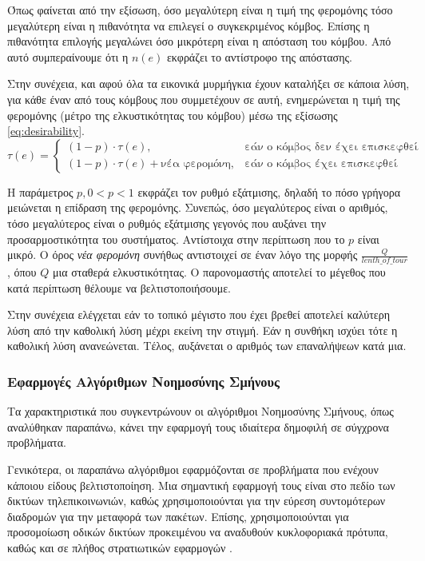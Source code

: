 \documentclass{assignment}
\begin{document}
Όπως φαίνεται από την εξίσωση, όσο μεγαλύτερη είναι η τιμή της φερομόνης τόσο
μεγαλύτερη είναι η πιθανότητα να επιλεγεί ο συγκεκριμένος κόμβος. Επίσης η
πιθανότητα επιλογής μεγαλώνει όσο μικρότερη είναι η απόσταση του κόμβου. Από
αυτό συμπεραίνουμε ότι η $n(e)$ εκφράζει το αντίστροφο της απόστασης.

Στην συνέχεια, και αφού όλα τα εικονικά μυρμήγκια έχουν καταλήξει σε κάποια
λύση, για κάθε έναν από τους κόμβους που συμμετέχουν σε αυτή, ενημερώνεται η
τιμή της φερομόνης (μέτρο της ελκυστικότητας του κόμβου) μέσω της εξίσωσης
\ref{eq:desirability}.
\begin{equation}
    \label{eq:desirability}
\tau(e) = \begin{cases} (1 - p) \cdot \tau(e),& \mbox{εάν ο κόμβος δεν έχει επισκεφθεί}  \\ (1 - p) \cdot \tau(e) + \mbox{νέα φερομόνη},& \mbox{εάν ο κόμβος έχει επισκεφθεί} \end{cases}
\end{equation}

Η παράμετρος $p, 0 \lt p \lt 1$ εκφράζει τον ρυθμό εξάτμισης, δηλαδή το πόσο
γρήγορα μειώνεται η επίδραση της φερομόνης. Συνεπώς, όσο μεγαλύτερος είναι ο
αριθμός, τόσο μεγαλύτερος είναι ο ρυθμός εξάτμισης γεγονός που αυξάνει την
προσαρμοστικότητα του συστήματος. Αντίστοιχα στην περίπτωση που το $p$ είναι
μικρό. Ο όρος \emph{νέα φερομόνη} συνήθως αντιστοιχεί σε έναν λόγο της μορφής
$\frac{Q}{lenth\_of\_tour}$, όπου $Q$ μια σταθερά ελκυστικότητας. Ο παρονομαστής
αποτελεί το μέγεθος που κατά περίπτωση θέλουμε να βελτιστοποιήσουμε.

Στην συνέχεια ελέγχεται εάν το τοπικό μέγιστο που έχει βρεθεί αποτελεί καλύτερη
λύση από την καθολική λύση μέχρι εκείνη την στιγμή. Εάν η συνθήκη ισχύει τότε
η καθολική λύση ανανεώνεται. Τέλος, αυξάνεται ο αριθμός των επαναλήψεων κατά
μια.
\subsubsection*{Εφαρμογές Αλγόριθμων Νοημοσύνης Σμήνους}
Τα χαρακτηριστικά που συγκεντρώνουν οι αλγόριθμοι Νοημοσύνης Σμήνους,
όπως αναλύθηκαν παραπάνω, κάνει την εφαρμογή τους ιδιαίτερα δημοφιλή σε
σύγχρονα προβλήματα.

Γενικότερα, οι παραπάνω αλγόριθμοι εφαρμόζονται σε προβλήματα που ενέχουν
κάποιου είδους βελτιστοποίηση. Μια σημαντική εφαρμογή τους είναι στο πεδίο
των δικτύων τηλεπικοινωνιών, καθώς χρησιμοποιούνται για την εύρεση συντομότερων
διαδρομών για την μεταφορά των πακέτων. Επίσης, χρησιμοποιούνται για προσομοίωση
οδικών δικτύων προκειμένου να αναδυθούν κυκλοφοριακά πρότυπα, καθώς και σε
πλήθος στρατιωτικών εφαρμογών \cite{jevtic2007swarm}.
\end{document}
